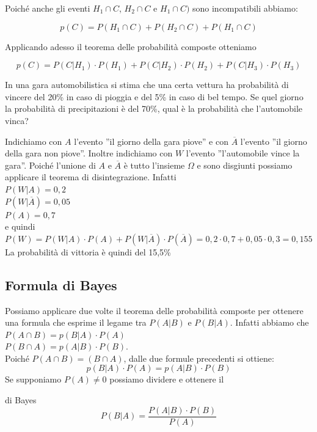 Poiché anche gli eventi $H_1 \cap C$, $H_2 \cap C$ e $H_1 \cap C)$ sono 
incompatibili abbiamo:

$$p(C)=P(H_1 \cap C)+P(H_2 \cap C) + P(H_1 \cap C)$$

Applicando adesso il teorema delle probabilità composte otteniamo

$$p(C)=P(C|H_1)\cdot P(H_1)+P(C|H_2)\cdot P(H_2)+P(C|H_3)\cdot P(H_3)$$
\begin{esempio}
In una gara automobilistica si stima che una certa vettura ha probabilità di 
vincere del 20\% in caso di pioggia e del 5\% in caso di bel tempo. Se quel 
giorno la probabilità di precipitazioni è del 70\%, qual è la probabilità che 
l'automobile vinca?

Indichiamo con $A$ l'evento ''il giorno della gara piove'' e con $\overline 
A$ 
l'evento ''il giorno della gara non piove''. Inoltre indichiamo con $W$ 
l'evento ''l'automobile vince la gara''. Poiché l'unione di $A$ e $\overline 
A$ 
è tutto l'insieme $\Omega$ e sono disgiunti possiamo applicare il teorema di 
disintegrazione. Infatti\\
$P(W|A)=0,2$\\
$P(W|\overline A)=0,05$\\
$P(A)=0,7$\\
e quindi\\
$P(W)=P(W|A)\cdot P(A) + P(W|\overline A)\cdot P(\overline A)=0,2 \cdot 0,7 + 
0,05 \cdot 0,3 = 0,155$\\
La probabilità di vittoria è quindi del 15,5\%
\end{esempio}

\subsection{Formula di Bayes}
Possiamo applicare due volte il teorema delle probabilità composte per 
ottenere 
una formula che esprime il legame tra $P(A|B)$ e $P(B|A)$.
Infatti abbiamo che \\
$P(A\cap B)=p(B|A)\cdot P(A)$ \\
$P(B\cap A)=p(A|B)\cdot P(B)$.\\
Poiché $P(A\cap B) = (B\cap A)$, dalle due formule precedenti si ottiene:
$$p(B|A)\cdot P(A) = p(A|B)\cdot P(B)$$
Se supponiamo $P(A) \neq 0$ possiamo dividere e ottenere il
\begin{teorema}{di Bayes}
$$P(B|A)=\dfrac{P(A|B)\cdot P(B)}{P(A)}$$ 
\end{teorema} 


